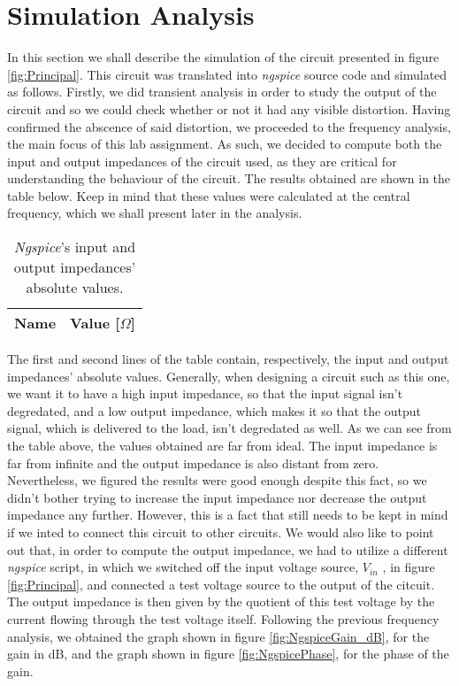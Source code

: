 \clearpage

\section{Simulation Analysis}
\label{sec:simulation}
\vspace{-0.5cm}
In this section we shall describe the simulation of the circuit presented in figure \ref{fig:Principal}. This circuit was translated into \emph{ngspice}
source code and simulated as follows.
Firstly, we did transient analysis in order to study the output of the circuit and so we could check whether or
not it had any visible distortion. Having confirmed the abscence of said distortion, we proceeded to the frequency analysis,
the main focus of this lab assignment.
As such, we decided to compute both the input and output impedances of the circuit used, as they are critical for
understanding the behaviour of the circuit. The results obtained are shown in the table below. Keep in mind that these values were calculated
at the central frequency, which we shall present later in the analysis.

\vspace{-0.65cm}
\begin{table}[h]\label{tab:SimZ}
    \centering
    \begin{tabular}{|c|c|}
      \hline
      {\bf Name} & {\bf Value [$\Omega$]} \\ \hline
      
    \end{tabular}
    \vspace{-2.5mm}
    \caption{\emph{Ngspice}'s input and output impedances' absolute values.}
\end{table}

\vspace{-0.45cm}
The first and second lines of the table contain, respectively, the input and output impedances' absolute values.
Generally, when designing a circuit such as this one, we want it to have a high input impedance,
so that the input signal isn’t degredated, and a low output impedance, which makes it so that the
output signal, which is delivered to the load, isn’t degredated as well. As we
can see from the table above, the values obtained are far from ideal. The input impedance is far from infinite and the output impedance is also
distant from zero. Nevertheless, we figured the results were good enough despite this fact, so we didn't bother trying to increase the input
impedance nor decrease the output impedance any further. However, this is a fact that still needs to be kept in mind if we inted to connect this circuit
to other circuits. We would also like to point out that, in order to compute the output impedance, we had to utilize a different \emph{ngspice} 
script, in which we switched off the input voltage source, $V_{in}$ , in figure \ref{fig:Principal}, and connected a test voltage source to
the output of the citcuit. The output impedance is then given by the quotient
of this test voltage by the current flowing through the test voltage itself.
Following the previous frequency analysis, we obtained the graph shown in figure \ref{fig:NgspiceGain_dB}, for the
gain in dB, and the graph shown in figure \ref{fig:NgspicePhase}, for the phase of the gain.

